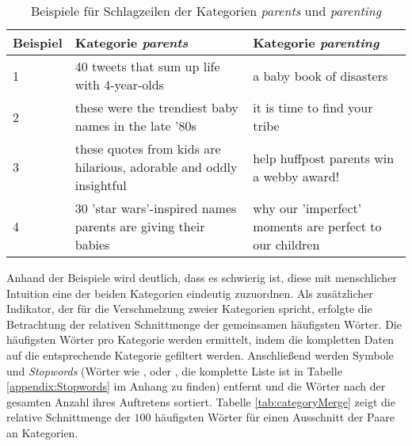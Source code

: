 \documentclass[a4paper,11pt]{article}
\begin{document}
\begin{table}[ht]
\begin{center}
\begin{tabular}{ | p{} | p{}| p{} | }
  \hline
Beispiel & Kategorie \textit{parents}  & Kategorie \textit{parenting} \\ 
  \hline
1 & 40 tweets that sum up life with 4-year-olds & a baby book of disasters \\ 
  2 & these were the trendiest baby names in the late '80s & it is time to find your tribe \\ 
  3 & these quotes from kids are hilarious, adorable and oddly insightful & help huffpost parents win a webby award! \\ 
  4 & 30  'star wars'-inspired names parents are giving their babies & why our 'imperfect' moments are perfect to our children \\ 
   \hline
\end{tabular}
\caption{Beispiele für Schlagzeilen der Kategorien \textit{parents} und \textit{parenting}}
\label{tab:parentsMerge}
\end{center}
\end{table}

Anhand der Beispiele wird deutlich, dass es schwierig ist, diese mit menschlicher Intuition eine der beiden Kategorien eindeutig zuzuordnen. Als zusätzlicher Indikator, der für die Verschmelzung zweier Kategorien spricht, erfolgte die Betrachtung der relativen Schnittmenge der gemeinsamen häufigsten Wörter. Die häufigsten Wörter pro Kategorie werden ermittelt, indem die kompletten Daten auf die entsprechende Kategorie gefiltert werden. Anschließend werden Symbole und \textit{Stopwords} (Wörter wie ,  oder , die komplette Liste ist in Tabelle \ref{appendix:Stopwords} im Anhang zu finden) entfernt und die Wörter nach der gesamten Anzahl ihres Auftretens sortiert. Tabelle \ref{tab:categoryMerge} zeigt die relative Schnittmenge der $100$ häufigsten Wörter für einen Ausschnitt der Paare an Kategorien.
\end{document}
